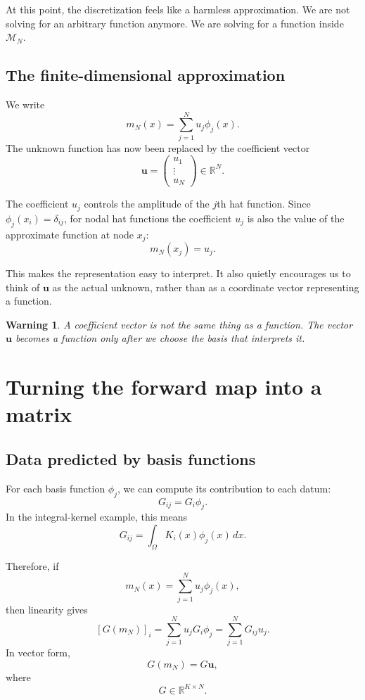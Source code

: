 \documentclass[11pt,a4paper]{book}
\newtheorem{warning}[definition]{Warning}
\newcommand{\M}{\mathcal{M}}      %
\newcommand{\G}{G}
\begin{document}
At this point, the discretization feels like a harmless approximation. We are
not solving for an arbitrary function anymore. We are solving for a function
inside $\M_N$.

\subsection{The finite-dimensional approximation}

We write
\[
    m_N(x) = \sum_{j=1}^{N} u_j \phi_j(x).
\]
The unknown function has now been replaced by the coefficient vector
\[
    \bm{u}
    =
    \begin{pmatrix}
        u_1\\
        \vdots\\
        u_N
    \end{pmatrix}
    \in \mathbb{R}^N.
\]

The coefficient $u_j$ controls the amplitude of the $j$th hat function. Since
$\phi_j(x_i)=\delta_{ij}$, for nodal hat functions the coefficient $u_j$ is also
the value of the approximate function at node $x_j$:
\[
    m_N(x_j) = u_j.
\]

This makes the representation easy to interpret. It also quietly encourages us
to think of $\bm{u}$ as the actual unknown, rather than as a coordinate vector
representing a function.

\begin{warning}
A coefficient vector is not the same thing as a function. The vector
$\bm{u}$ becomes a function only after we choose the basis that interprets it.
\end{warning}

\section{Turning the forward map into a matrix}

\subsection{Data predicted by basis functions}

For each basis function $\phi_j$, we can compute its contribution to each datum:
\[
    G_{ij} = \G_i \phi_j.
\]
In the integral-kernel example, this means
\[
    G_{ij}
    =
    \int_{\Omega} K_i(x)\phi_j(x)\,dx.
\]

Therefore, if
\[
    m_N(x)
    =
    \sum_{j=1}^{N} u_j\phi_j(x),
\]
then linearity gives
\[
    [\G(m_N)]_i
    =
    \sum_{j=1}^N u_j \G_i\phi_j
    =
    \sum_{j=1}^N G_{ij}u_j.
\]
In vector form,
\[
    \G(m_N) = G\bm{u},
\]
where
\[
    G \in \mathbb{R}^{K \times N}.
\]
\end{document}
